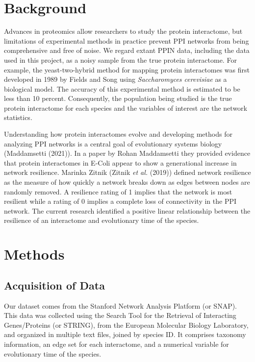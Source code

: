 \documentclass[12pt]{article}
\begin{document}
\section{Background}
Advances in proteomics allow researchers to study the protein interactome, but limitations of experimental methods in practice prevent PPI networks from being comprehensive and free of noise. We regard extant PPIN data, including the data used in this project, as a noisy sample from the true protein interactome. For example, the yeast-two-hybrid method for mapping protein interactomes was first developed in 1989 by Fields and Song using \textit{Saccharomyces cerevisiae} as a biological model. The accuracy of this experimental method is estimated to be less than 10 percent. Consequently, the population being studied is the true protein interactome for each species and the variables of interest are the network statistics.

Understanding how protein interactomes evolve and developing methods for analyzing PPI networks is a central goal of evolutionary systems biology (Maddamsetti (2021)). In a paper by Rohan Maddamsetti they provided evidence that protein interactomes in E-Coli appear to show a generational increase in network resilience. Marinka Zitnik (Zitnik \textit{et al.} (2019)) defined network resilience as the measure of how quickly a network breaks down as edges between nodes are randomly removed. A resilience rating of 1 implies that the network is most resilient while a rating of 0 implies a complete loss of connectivity in the PPI network. The current research identified a positive linear relationship between the resilience of an interactome and evolutionary time of the species.

\section{Methods}
\subsection{Acquisition of Data}
Our dataset comes from the Stanford Network Analysis Platform (or SNAP). This data was collected using the Search Tool for the Retrieval of Interacting Genes/Proteins (or STRING), from the European Molecular Biology Laboratory, and organized in multiple text files, joined by species ID. It comprises taxonomy information, an edge set for each interactome, and a numerical variable for evolutionary time of the species.
\end{document}
